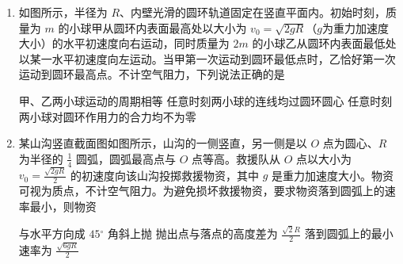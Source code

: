 \begin{enumerate}
{输入电压的频率为 $ 100 \UHz $}
{原线圈的输入功率为 $ 11 \UW $}
{流过原线圈的电流最大值为 $ 0.11 \UA $}


\item
如图所示，半径为 $ R $、内壁光滑的圆环轨道固定在竖直平面内。初始时刻，质量为 $ m $ 的小球甲从圆环内表面最高处以大小为 $ v_{0} = \sqrt {2gR} $（$ g $为重力加速度大小）的水平初速度向右运动，同时质量为 $ 2 m $ 的小球乙从圆环内表面最低处以某一水平初速度向左运动。当甲第一次运动到圆环最低点时，乙恰好第一次运动到圆环最高点。不计空气阻力，下列说法正确的是 
\begin{figure}[htbp]
	\centering
	
\end{figure}

{甲、乙两小球运动的周期相等}
{任意时刻两小球的连线均过圆环圆心}
{任意时刻两小球对圆环作用力的合力均不为零}


\item
某山沟竖直截面图如图所示，山沟的一侧竖直，另一侧是以 $ O $ 点为圆心、$ R $ 为半径的 $ \frac{1}{4} $ 圆弧，圆弧最高点与 $ O $ 点等高。救援队从 $ O $ 点以大小为 $ v_{0} = \frac{{\sqrt {2gR} }}{2} $ 的初速度向该山沟投掷救援物资，其中 $ g $ 是重力加速度大小。物资可视为质点，不计空气阻力。为避免损坏救援物资，要求物资落到圆弧上的速率最小，则物资 
\begin{figure}[htbp]
	\centering
	
\end{figure}

{与水平方向成 $ 45 {^\circ} $ 角斜上抛}
{抛出点与落点的高度差为 $ \frac{{\sqrt 2 R}}{2} $}
{落到圆弧上的最小速率为 $ \frac{{\sqrt {6gR} }}{2} $}


\end{enumerate}
